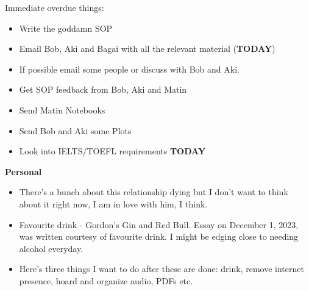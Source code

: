 \noindent {}
Immediate overdue things:
\begin{itemize}
    \item Write the goddamn SOP
    \item Email Bob, Aki and Bagai with all the relevant material (\textbf{TODAY})
    \item If possible email some people or discuss with Bob and Aki. 
    \item Get SOP feedback from Bob, Aki and Matin
    \item Send Matin Notebooks
    \item Send Bob and Aki some Plots
    \item Look into IELTS/TOEFL requirements \textbf{TODAY}
\end{itemize}

\noindent \textbf{Personal}\\
\begin{itemize}
    \item There's a bunch about this relationship dying but I don't want to think about it right now, I am in love with him, I think.
    \item Favourite drink - Gordon's Gin and Red Bull. Essay on December 1, 2023, was written courtesy of favourite drink. I might be edging close to needing alcohol everyday.
    \item  Here's three things I want to do after these are done: drink, remove internet presence, hoard and organize audio, PDFs etc.
\end{itemize}